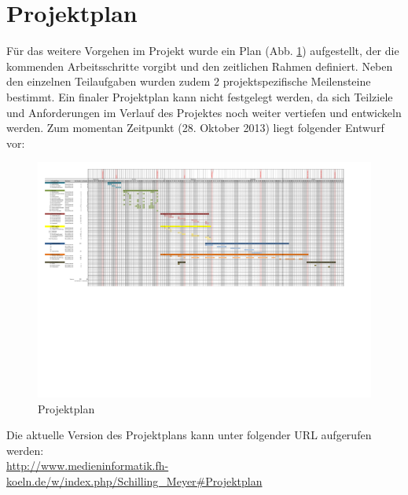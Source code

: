 
\section{Projektplan}
Für das weitere Vorgehen im Projekt wurde ein Plan (Abb. \ref{fig:projektplan}) aufgestellt, der die kommenden Arbeitsschritte vorgibt und den zeitlichen Rahmen definiert. Neben den einzelnen Teilaufgaben wurden zudem 2 projektspezifische Meilensteine bestimmt. Ein finaler Projektplan kann nicht festgelegt werden, da sich Teilziele und Anforderungen im Verlauf des Projektes noch weiter vertiefen und entwickeln werden. Zum momentan Zeitpunkt (28. Oktober 2013) liegt folgender Entwurf vor:

\begin{figure}[H]
\includegraphics[width=.9\textwidth, trim=20 250 150 0]{./images/projektplan.pdf}
\caption{Projektplan}
\label{fig:projektplan}
\end{figure}

Die aktuelle Version des Projektplans kann unter folgender URL aufgerufen werden:\\
\url{http://www.medieninformatik.fh-koeln.de/w/index.php/Schilling_Meyer#Projektplan}
